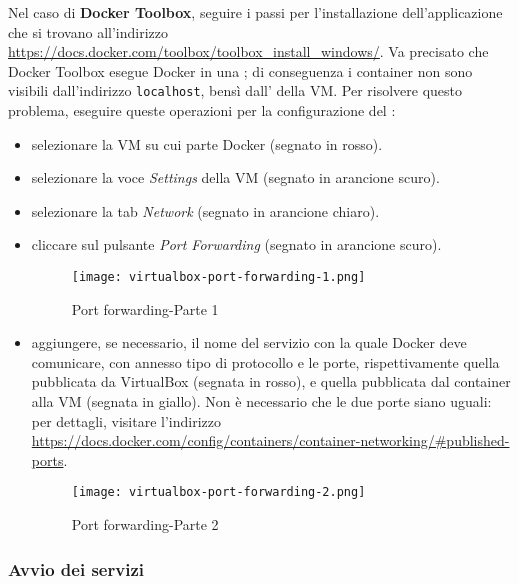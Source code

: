 \documentclass[../../manuale-manutentore.tex]{subfiles}
\begin{document}
Nel caso di \textbf{Docker Toolbox}, seguire i passi per l'installazione dell'applicazione che si trovano all'indirizzo \href{https://docs.docker.com/toolbox/toolbox_install_windows/}{https://docs.docker.com/toolbox/toolbox\_install\_windows/}.
Va precisato che Docker Toolbox esegue Docker in una ; di conseguenza i container non sono visibili dall'indirizzo \texttt{localhost}, bensì dall' della VM\@.
Per risolvere questo problema, eseguire queste operazioni per la configurazione del :
\begin{itemize}
  \item selezionare la VM su cui parte Docker (segnato in rosso).
  \item selezionare la voce \textit{Settings} della VM (segnato in arancione scuro).
  \item selezionare la tab \textit{Network} (segnato in arancione chiaro).
  \item cliccare sul pulsante \textit{Port Forwarding} (segnato in arancione scuro).

  \begin{figure}[H]
    \centering
    \texttt{[image: virtualbox-port-forwarding-1.png]}
    \caption{Port forwarding-Parte 1}%
    \label{fig:port_forwarding_parte_1}
  \end{figure}

  \item aggiungere, se necessario, il nome del servizio con la quale Docker deve comunicare, con annesso tipo di protocollo e le porte, rispettivamente quella pubblicata da VirtualBox (segnata in rosso), e quella pubblicata dal container alla VM (segnata in giallo). Non è necessario che le due porte siano uguali: per dettagli, visitare l'indirizzo \href{https://docs.docker.com/config/containers/container-networking/#published-ports}{https://docs.docker.com/config/containers/container-networking/\#published-ports}.

  \begin{figure}[H]
    \centering
    \texttt{[image: virtualbox-port-forwarding-2.png]}
    \caption{Port forwarding-Parte 2}%
    \label{fig:port_forwarding_parte_2}
  \end{figure}
\end{itemize}

\subsubsection{Avvio dei servizi}%
\label{subs:avvio_dei_servizi}
\end{document}
